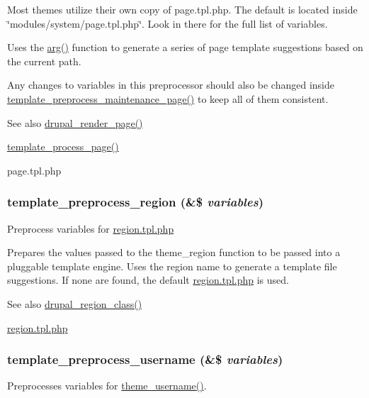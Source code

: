 Most themes utilize their own copy of page.tpl.php. The default is located inside \char`\"{}modules/system/page.tpl.php\char`\"{}. Look in there for the full list of variables.

Uses the \hyperlink{bootstrap_8inc_afd40bf1dc5dc1f68fb326a8f6e0b88da}{arg()} function to generate a series of page template suggestions based on the current path.

Any changes to variables in this preprocessor should also be changed inside \hyperlink{includes_2theme_8inc_a14a92df5f5e74cebcf7fb680885e58a5}{template\_\-preprocess\_\-maintenance\_\-page()} to keep all of them consistent.

\begin{DoxySeeAlso}{See also}
\hyperlink{common_8inc_ad85d021b660f070849ed7c215d9758fe}{drupal\_\-render\_\-page()} 

\hyperlink{includes_2theme_8inc_aa9c8d115ebdc2baeae402b3d7e6b392b}{template\_\-process\_\-page()} 

page.tpl.php 
\end{DoxySeeAlso}
\hypertarget{includes_2theme_8inc_a587933392ed2e45a220b08c5708ecaab}{
\subsubsection[{template\_\-preprocess\_\-region}]{\setlength{\rightskip}{0pt plus 5cm}template\_\-preprocess\_\-region (\&\$ {\em variables})}}
\label{includes_2theme_8inc_a587933392ed2e45a220b08c5708ecaab}
Preprocess variables for \hyperlink{region_8tpl_8php}{region.tpl.php}

Prepares the values passed to the theme\_\-region function to be passed into a pluggable template engine. Uses the region name to generate a template file suggestions. If none are found, the default \hyperlink{region_8tpl_8php}{region.tpl.php} is used.

\begin{DoxySeeAlso}{See also}
\hyperlink{common_8inc_a601489210268565d75adb9af61643e6c}{drupal\_\-region\_\-class()} 

\hyperlink{region_8tpl_8php}{region.tpl.php} 
\end{DoxySeeAlso}
\hypertarget{includes_2theme_8inc_a102e6392077c4dc3810ec48fdf60fd8c}{
\subsubsection[{template\_\-preprocess\_\-username}]{\setlength{\rightskip}{0pt plus 5cm}template\_\-preprocess\_\-username (\&\$ {\em variables})}}
\label{includes_2theme_8inc_a102e6392077c4dc3810ec48fdf60fd8c}
Preprocesses variables for \hyperlink{group__themeable_ga94b6d36f659ae6bf42e7971682cd24eb}{theme\_\-username()}.

